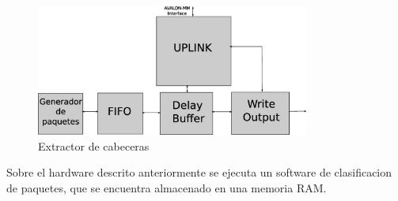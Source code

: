 \begin{figure}[h]
  \centering
	\includegraphics[width=0.80\textwidth]{2-sistema/graf/extractor.eps}
  \caption{Extractor de cabeceras}
  \label{fig}
\end{figure}

Sobre el hardware descrito anteriormente se ejecuta un software de clasificacion de paquetes, que se encuentra almacenado en una memoria RAM.



